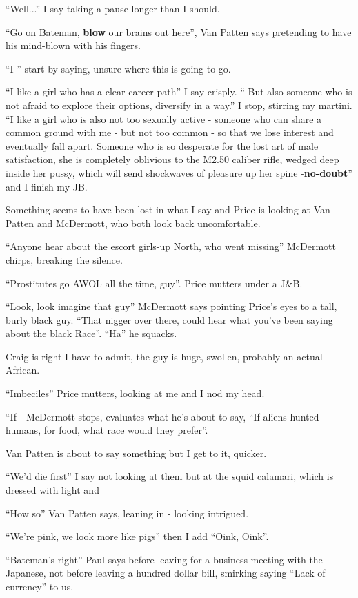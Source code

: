 \documentclass[19pt,openany]{book}
\begin{document}
``Well...'' I say taking a pause
longer than I should.

``Go on Bateman, \textbf{blow}
our brains out here'', Van Patten
says pretending to have his
mind-blown with his fingers.

``I-'' start
by saying, unsure
where this is going to go.

``I like a girl
who has a clear career path''
I say crisply. ``
But also someone who is not afraid to
explore their options,
diversify in a way.'' I
stop, stirring
my martini. ``I like a girl who is
also not too sexually active - someone
who can share a common ground with me
- but not too common - so that
we lose interest and eventually fall
apart. Someone who is so desperate
for the lost art of male satisfaction,
she is completely oblivious
to the M2.50 caliber rifle, wedged deep inside
her pussy, which will send shockwaves
of pleasure up her spine
-\textbf{no-doubt}'' and I
finish my JB.

Something seems to have
been lost in what I say
and Price is looking
at Van Patten and McDermott,
who both look back uncomfortable.

``Anyone hear about the escort
girls-up North, who went missing'' McDermott
chirps, breaking the silence.

``Prostitutes go AWOL all the time,
guy''. Price mutters under
a J\&B.


``Look, look imagine that
guy'' McDermott
says pointing Price's eyes to a
tall, burly black guy.
``That nigger over there,
could hear what you've been
saying about the black Race''.
``Ha'' he squacks.

Craig is right I have to admit,
the guy is huge, swollen, probably an actual
African.

``Imbeciles'' Price mutters, looking
at me and I nod my head.

``If - McDermott stops, evaluates
what he's about to say, ``If aliens
hunted humans, for food, what race would
they prefer''.

Van Patten is about to say something but
I get to it, quicker.

``We'd die first'' I say not looking at them
but at the squid calamari, which is dressed
with light and

``How so'' Van Patten says, leaning in -
looking intrigued.

``We're pink, we look more like pigs'' then
I add ``Oink, Oink''.

``Bateman's right'' Paul says
before leaving for
a business meeting with the Japanese, not
before leaving a hundred dollar bill,
smirking saying ``Lack of currency'' to us.
\end{document}
